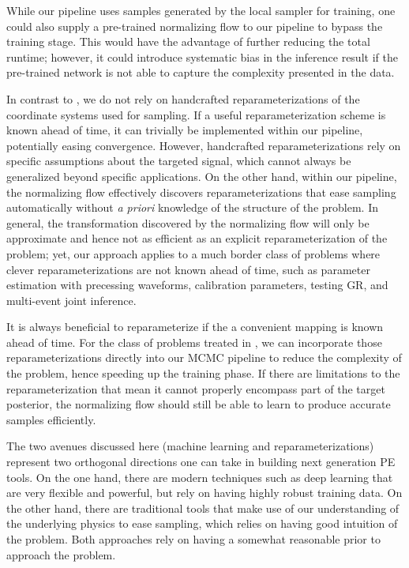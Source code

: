 \documentclass[twocolumn]{aastex631}
\begin{document}
While our pipeline uses samples generated by the local sampler for training,
one could also supply a pre-trained normalizing flow to our pipeline to bypass
the training stage. This would have the advantage of further reducing the total
runtime; however, it could introduce systematic bias in the inference result if
the pre-trained network is not able to capture the complexity presented in the
data.

In contrast to \cite{Islam:2022afg,Roulet:2022kot}, we do not rely on
handcrafted reparameterizations of the coordinate systems used for sampling. If
a useful reparameterization scheme is known ahead of time, it can trivially
be implemented within our pipeline, potentially easing convergence. However,
handcrafted reparameterizations rely on specific assumptions about the targeted
signal, which cannot always be generalized beyond specific applications. On the
other hand, within our pipeline, the normalizing flow effectively discovers
reparameterizations that ease sampling automatically without \emph{a priori}
knowledge of the structure of the problem. In general, the transformation
discovered by the normalizing flow will only be approximate and hence not as
efficient as an explicit reparameterization of the problem; yet, our approach
applies to a much border class of problems where clever reparameterizations are
not known ahead of time, such as parameter estimation with precessing
waveforms, calibration parameters, testing GR, and multi-event joint inference.

It is always beneficial to reparameterize if the a convenient mapping is known
ahead of time. For the class of problems treated in
\cite{Islam:2022afg,Roulet:2022kot}, we can incorporate those
reparameterizations directly into our MCMC pipeline to reduce the complexity of
the problem, hence speeding up the training phase. If there are limitations to
the reparameterization that mean it cannot properly encompass part of the
target posterior, the normalizing flow should still be able to learn to produce
accurate samples efficiently.

The two avenues discussed here (machine learning and reparameterizations)
represent two orthogonal directions one can take in building next generation PE
tools. On the one hand, there are modern techniques such as deep learning that
are very flexible and powerful, but rely on having highly robust training data.
On the other hand, there are traditional tools that make use of our
understanding of the underlying physics to ease sampling, which relies
on having good intuition of the problem. Both approaches rely on having a
somewhat reasonable prior to approach the problem.
\end{document}

